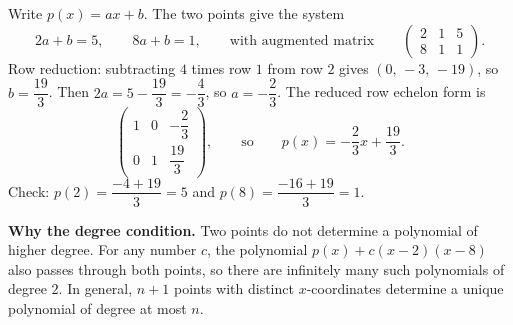 Write $p(x)=ax+b$. The two points give the system
\[
2a+b=5,\qquad 8a+b=1,
\qquad\text{with augmented matrix}\qquad
\begin{pmatrix}2&1&5\\8&1&1\end{pmatrix}.
\]
Row reduction: subtracting $4$ times row $1$ from row $2$ gives $(0,\,-3,\,-19)$, so $b=\dfrac{19}{3}$. Then $2a=5-\dfrac{19}{3}=-\dfrac{4}{3}$, so $a=-\dfrac{2}{3}$. The reduced row echelon form is
\[
\begin{pmatrix}1&0&-\dfrac{2}{3}\\[4pt]0&1&\dfrac{19}{3}\end{pmatrix},
\qquad\text{so}\qquad
\boxed{p(x)=-\dfrac{2}{3}x+\dfrac{19}{3}}.
\]
Check: $p(2)=\dfrac{-4+19}{3}=5$ and $p(8)=\dfrac{-16+19}{3}=1$.

\textbf{Why the degree condition.} Two points do not determine a polynomial of higher degree. For any number $c$, the polynomial $p(x)+c(x-2)(x-8)$ also passes through both points, so there are infinitely many such polynomials of degree $2$. In general, $n+1$ points with distinct $x$-coordinates determine a unique polynomial of degree at most $n$.
